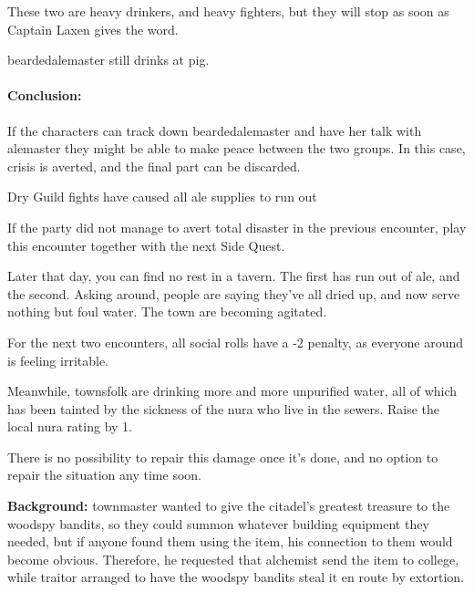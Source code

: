 \begin{multicols}{2}

These two are heavy drinkers, and heavy fighters, but they will stop as soon as Captain Laxen gives the word.


\Gls{beardedalemaster} still drinks at \gls{pig}.  

\paragraph{Conclusion:} If the characters can track down \gls{beardedalemaster} and have her talk with \gls{alemaster} they might be able to make peace between the two groups.
In this case, crisis is averted, and the final part can be discarded.

\beardedalemaster

{\N\squash Dry}%
{Guild fights have caused all ale supplies to run out}%

If the party did not manage to avert total disaster in the previous encounter, play this encounter together with the next Side Quest.

\begin{boxtext}

  Later that day, you can find no rest in a tavern.  The first has run out of ale, and the second.  Asking around, people are saying they've all dried up, and now serve nothing but foul water.  The town are becoming agitated.

\end{boxtext}

For the next two encounters, all social rolls have a -2 penalty, as everyone around is feeling irritable.

Meanwhile, townsfolk are drinking more and more unpurified water, all of which has been tainted by the sickness of the nura who live in the sewers.  Raise the local nura rating by 1.

There is no possibility to repair this damage once it's done, and no option to repair the situation any time soon.

\stopcontents[sq]

\resumecontents[Villages]
\label{lizardite}
\stopcontents[Villages]

\startcontents[sq]

\sqminitoc

\noindent
\textbf{Background:}
\gls{townmaster} wanted to give the citadel's greatest treasure to the woodspy bandits, so they could summon whatever building equipment they needed, but if anyone found them using the item, his connection to them would become obvious.
Therefore, he requested that \gls{alchemist} send the item to \gls{college}, while \gls{traitor} arranged to have the woodspy bandits steal it en route by extortion.


\end{multicols}
